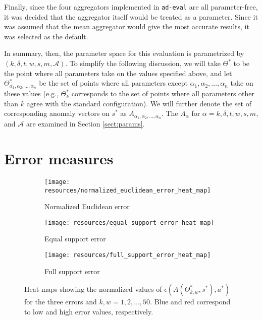 Finally, since the four aggregators implemented in \texttt{ad-eval} are all parameter-free, it was decided that the aggregator itself would be treated as a parameter. Since it was assumed that the mean aggregator would give the most accurate results, it was selected as the default.

In summary, then, the parameter space for this evaluation is parametrized by $(k, \delta, t, w, s, m, \mathcal{A})$. To simplify the following discussion, we will take $\Theta^*$ to be the point where all parameters take on the values specified above, and let $\Theta^*_{\alpha_1, \alpha_2, \dots, \alpha_n}$ be the set of points where all parameters except $\alpha_1, \alpha_2, \dots, \alpha_n$ take on these values (e.g., $\Theta^*_k$ corresponds to the set of points where all parameters other than $k$ agree with the standard configuration). We will further denote the set of corresponding anomaly vectors on $s^*$ as $A_{\alpha_1, \alpha_2, \dots, \alpha_n}$. The $A_\alpha$ for $\alpha = k, \delta, t, w, s, m$, and $\mathcal{A}$ are examined in Section \ref{sect:params}.

\section{Error measures}
\label{sect:error_measure_eval}

\begin{figure}[H]
    \centering
    \begin{subfigure}[b]{0.32\textwidth}
        \centering
        \texttt{[image: resources/normalized\_euclidean\_error\_heat\_map]}
        \caption{Normalized Euclidean error}
    \end{subfigure}
    \begin{subfigure}[b]{0.32\textwidth}
        \centering
        \texttt{[image: resources/equal\_support\_error\_heat\_map]}
        \caption{Equal support error}
    \end{subfigure}
    \begin{subfigure}[b]{0.32\textwidth}
        \centering
        \texttt{[image: resources/full\_support\_error\_heat\_map]}
        \caption{Full support error}
    \end{subfigure}
    \caption{Heat maps showing the normalized values of $\epsilon(A(\Theta_{k, w}^*, s^*), a^*)$ for the three errors and $k, w = 1,2,\dots,50$. Blue and red correspond to low and high error values, respectively.}
    \label{fig:error_heat_maps}
    \vspace{-10pt}
\end{figure}

